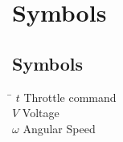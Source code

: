\chapter*{Symbols}
\label{sec:symbols}

\section*{Symbols}

\begin{tabbing}
 \hspace*{1.6cm} \= \kill
  $t$                \> Throttle command\\[0.5ex] 					
  $V$                   \> Voltage \\[0.5ex]										
  $\omega$              \> Angular Speed \\[0.5ex]   		
\end{tabbing}


